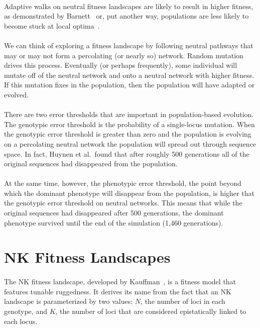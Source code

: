 \documentclass[12pt,letterpaper,titlepage]{article}
\begin{document}
\paragraph{}
Adaptive walks on neutral fitness landscapes are likely to result in higher
fitness, as demonstrated by Barnett~\cite{Barnett1998} or, put another way,
populations are less likely to become stuck at local optima~\cite{Newman1998}.

\paragraph{}
We can think of exploring a fitness landscape by following neutral pathways
that may or may not form a percolating (or nearly so) network. Random mutation
drives this process. Eventually (or perhaps frequently), some individual will
mutate off of the neutral network and onto a neutral network with higher
fitness. If this mutation fixes in the population, then the population will
have adapted or evolved.

\paragraph{}
There are two error thresholds that are important in population-based
evolution. The genotypic error threshold is the probability of a single-locus
mutation. When the genotypic error threshold is greater than zero and the
population is evolving on a percolating neutral network the population will
spread out through sequence space. In fact, Huynen et al.\ found that after
roughly 500 generations all of the original sequences had disappeared from the
population.

\paragraph{}
At the same time, however, the phenotypic error threshold, the point beyond
which the dominant phenotype will disappear from the population, is higher that
the genotypic error threshold on neutral networks. This means that while the
original sequences had disappeared after 500 generations, the dominant
phenotype survived until the end of the simulation (1,460 generations).

\section{NK Fitness Landscapes}

\paragraph{}
The NK fitness landscape, developed by Kauffman~\cite{Kauffman1993}, is a
fitness model that features tunable ruggedness. It derives its name from the
fact that an NK landscape is parameterized by two values: $N$, the number of
loci in each genotype, and $K$, the number of loci that are considered
epistatically linked to each locus.
\end{document}
